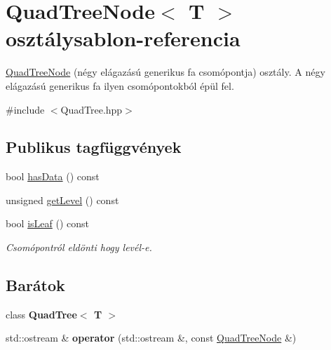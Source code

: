 \hypertarget{class_quad_tree_node}{\section{Quad\-Tree\-Node$<$ T $>$ osztálysablon-\/referencia}
\label{class_quad_tree_node}
}


\hyperlink{class_quad_tree_node}{Quad\-Tree\-Node} (négy elágazású generikus fa csomópontja) osztály. A négy elágazású generikus fa ilyen csomópontokból épül fel.  




{\ttfamily \#include $<$Quad\-Tree.\-hpp$>$}

\subsection*{Publikus tagfüggvények}
\begin{DoxyCompactItemize}
\item 
bool \hyperlink{class_quad_tree_node_a8b141eb49215f569ab3735cfd9f43d6e}{has\-Data} () const 
\item 
unsigned \hyperlink{class_quad_tree_node_a8b7e28da3aa5403e367b3c4ed094ba00}{get\-Level} () const 
\item 
bool \hyperlink{class_quad_tree_node_a9c6c010af46e16c4c2829b867055528b}{is\-Leaf} () const 
\begin{DoxyCompactList}\small\item\em Csomópontról eldönti hogy levél-\/e. \end{DoxyCompactList}\end{DoxyCompactItemize}
\subsection*{Barátok}
\begin{DoxyCompactItemize}
\item 
\hypertarget{class_quad_tree_node_a86cf92e1bfbee775eead8ccd7dbdc1f8}{class {\bfseries Quad\-Tree$<$ T $>$}}\label{class_quad_tree_node_a86cf92e1bfbee775eead8ccd7dbdc1f8}

\item 
\hypertarget{class_quad_tree_node_ac25992d68676ddc77fb4702cc5f37338}{std\-::ostream \& {\bfseries operator} (std\-::ostream \&, const \hyperlink{class_quad_tree_node}{Quad\-Tree\-Node} \&)}\label{class_quad_tree_node_ac25992d68676ddc77fb4702cc5f37338}

\end{DoxyCompactItemize}


